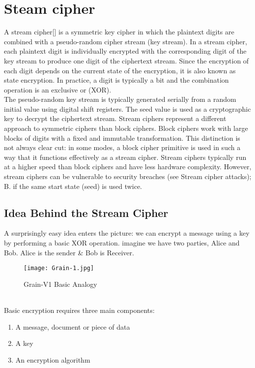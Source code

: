 \section{Steam cipher}
A stream cipher[\cite{Jiao2020}] is a symmetric key cipher in which the plaintext digits are combined with a pseudo-random cipher stream (key stream). In a stream cipher, each plaintext digit is individually encrypted with the corresponding digit of the key stream to produce one digit of the ciphertext stream. Since the encryption of each digit depends on the current state of the encryption, it is also known as state encryption. In practice, a digit is typically a bit and the combination operation is an exclusive or (XOR). \\[3mm]
The pseudo-random key stream is typically generated serially from a random initial value using digital shift registers. The seed value is used as a cryptographic key to decrypt the ciphertext stream. Stream ciphers represent a different approach to symmetric ciphers than block ciphers. Block ciphers work with large blocks of digits with a fixed and immutable transformation. This distinction is not always clear cut: in some modes, a block cipher primitive is used in such a way that it functions effectively as a stream cipher. Stream ciphers typically run at a higher speed than block ciphers and have less hardware complexity. However, stream ciphers can be vulnerable to security breaches (see Stream cipher attacks); B. if the same start state (seed) is used twice.
\subsection{Idea Behind the Stream Cipher}
A surprisingly easy idea enters the picture: we can encrypt a message using a key by performing a basic XOR operation. imagine we have two parties, Alice and Bob. Alice is the sender \& Bob is Receiver.
\begin{figure}[h]
	\centering
	\texttt{[image: Grain-1.jpg]}
	\caption{Grain-V1 Basic Analogy}
\end{figure}
\\Basic encryption requires three main components:
\begin{enumerate}
	\item {A message, document or piece of data}
	\item {A key}
	\item {An encryption algorithm}
\end{enumerate}

